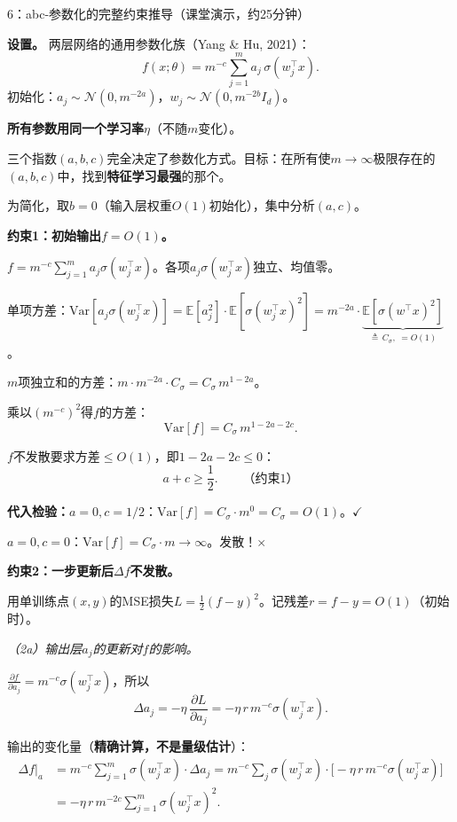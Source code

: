\documentclass[11pt,a4paper]{article}
\newcommand{\E}{\mathbb{E}}
\newcommand{\cN}{\mathcal{N}}
\begin{document}
\begin{handcalc}{6：abc-参数化的完整约束推导（课堂演示，约25分钟）}

\textbf{设置。} 两层网络的通用参数化族（Yang \& Hu, 2021）：
\[
f(x;\theta) = m^{-c}\sum_{j=1}^m a_j\,\sigma(w_j^\top x).
\]
初始化：$a_j\sim\cN(0,m^{-2a})$，$w_j\sim\cN(0,m^{-2b}I_d)$。

\textbf{所有参数用同一个学习率$\eta$}（不随$m$变化）。

三个指数$(a,b,c)$完全决定了参数化方式。目标：在所有使$m\to\infty$极限存在的$(a,b,c)$中，找到\textbf{特征学习最强}的那个。

为简化，取$b=0$（输入层权重$O(1)$初始化），集中分析$(a,c)$。

\tcblower

\textbf{约束1：初始输出$f=O(1)$。}

$f = m^{-c}\sum_{j=1}^m a_j\sigma(w_j^\top x)$。各项$a_j\sigma(w_j^\top x)$独立、均值零。

单项方差：$\text{Var}[a_j\sigma(w_j^\top x)] = \E[a_j^2]\cdot\E[\sigma(w_j^\top x)^2] = m^{-2a}\cdot\underbrace{\E[\sigma(w^\top x)^2]}_{\triangleq\, C_\sigma,\;=O(1)}$。

$m$项独立和的方差：$m\cdot m^{-2a}\cdot C_\sigma = C_\sigma\,m^{1-2a}$。

乘以$(m^{-c})^2$得$f$的方差：
\[
\text{Var}[f] = C_\sigma\,m^{1-2a-2c}.
\]

$f$不发散要求方差$\le O(1)$，即$1-2a-2c\le 0$：
\[
\boxed{a+c\ge \frac{1}{2}.} \qquad\text{（约束1）}
\]

\textbf{代入检验：}$a=0,c=1/2$：$\text{Var}[f]=C_\sigma\cdot m^0 = C_\sigma = O(1)$。$\checkmark$

$a=0,c=0$：$\text{Var}[f]=C_\sigma\cdot m \to\infty$。发散！$\times$

\bigskip
\textbf{约束2：一步更新后$\Delta f$不发散。}

用单训练点$(x,y)$的MSE损失$L=\frac{1}{2}(f-y)^2$。记残差$r=f-y=O(1)$（初始时）。

\medskip
\textit{（2a）输出层$a_j$的更新对$f$的影响。}

$\frac{\partial f}{\partial a_j} = m^{-c}\sigma(w_j^\top x)$，所以
\[
\Delta a_j = -\eta\,\frac{\partial L}{\partial a_j} = -\eta\,r\,m^{-c}\sigma(w_j^\top x).
\]

输出的变化量（\textbf{精确计算，不是量级估计}）：
\begin{align}
\Delta f\big|_a &= m^{-c}\sum_{j=1}^m \sigma(w_j^\top x)\cdot\Delta a_j = m^{-c}\sum_j \sigma(w_j^\top x)\cdot\big[-\eta\,r\,m^{-c}\sigma(w_j^\top x)\big] \\
&= -\eta\,r\,m^{-2c}\sum_{j=1}^m \sigma(w_j^\top x)^2.
\end{align}


\end{handcalc}
\end{document}
